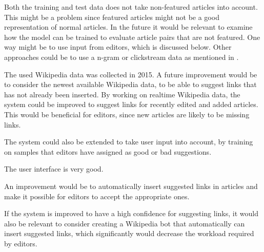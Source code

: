 Both the training and test data does not take non-featured articles into account. This might be a problem since featured articles might not be a good representation of normal articles. In the future it would be relevant to examine how the model can be trained to evaluate article pairs that are not featured. One way might be to use input from editors, which is discussed below. Other approaches could be to use a n-gram or clickstream data as mentioned in .



The used Wikipedia data was collected in 2015. A future improvement would be to consider the newest available Wikipedia data, to be able to suggest links that has not already been inserted.
By working on realtime Wikipedia data, the system could be improved to suggest links for recently edited and added articles. This would be beneficial for editors, since new articles are likely to be missing links.

The system could also be extended to take user input into account, by training on samples that editors have assigned as good or bad suggestions.

The user interface is very good. 

An improvement would be to automatically insert suggested links in articles and make it possible for editors to accept the appropriate ones.

If the system is improved to have a high confidence for suggesting links, it would also be relevant to consider creating a Wikipedia bot that automatically can insert suggested links, which significantly would decrease the workload required by editors.

